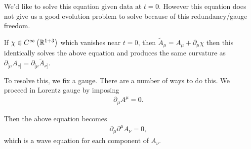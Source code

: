 We'd like to solve this equation given data at $t = 0$. However this equation does not give us a good evolution problem to solve because of this redundancy/gauge freedom.

If $\chi \in C^{\infty} \left( \mathbb{R}^{1 + 3} \right) $ which vanishes near $t = 0$, then $\widetilde{A}_{\mu} = A_{\mu} + \partial_\mu \chi$ then this identically solves the above equation and produces the same curvature as $\partial_{[\mu} A_{\nu ]} = \partial_{[\mu} \widetilde{A}_{\nu]}$.

To resolve this, we fix a gauge. There are a number of ways to do this. We proceed in Lorentz gauge by imposing 
\begin{align}
    \partial_\mu A^{\mu} = 0
.\end{align}

Then the above equation becomes
\begin{align}
    \partial_\mu \partial^{\mu} A_\nu = 0
,\end{align}
which is a wave equation for each component of $A_\nu$.


